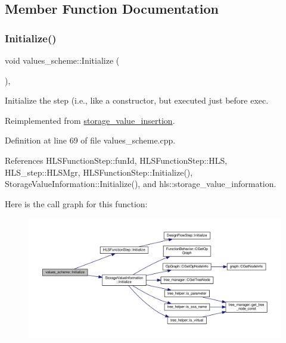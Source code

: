 \subsection{Member Function Documentation}
\mbox{\label{classvalues__scheme_aa31c876e845bc7ea78495e0b789cc51f}} 
\subsubsection{\texorpdfstring{Initialize()}{Initialize()}}
{\footnotesize\ttfamily void values\+\_\+scheme\+::\+Initialize (\begin{DoxyParamCaption}{ }\end{DoxyParamCaption})\hspace{0.3cm}{\ttfamily [override]}, {\ttfamily [virtual]}}



Initialize the step (i.\+e., like a constructor, but executed just before exec. 



Reimplemented from \hyperlink{classstorage__value__insertion_a43f36ebf82f907a629125b1f0cc1b096}{storage\+\_\+value\+\_\+insertion}.



Definition at line 69 of file values\+\_\+scheme.\+cpp.



References H\+L\+S\+Function\+Step\+::fun\+Id, H\+L\+S\+Function\+Step\+::\+H\+LS, H\+L\+S\+\_\+step\+::\+H\+L\+S\+Mgr, H\+L\+S\+Function\+Step\+::\+Initialize(), Storage\+Value\+Information\+::\+Initialize(), and hls\+::storage\+\_\+value\+\_\+information.

Here is the call graph for this function\+:
\nopagebreak
\begin{figure}[H]
\begin{center}
\leavevmode
\includegraphics[width=350pt]{dc/d08/classvalues__scheme_aa31c876e845bc7ea78495e0b789cc51f_cgraph}
\end{center}
\end{figure}
\mbox{\label{classvalues__scheme_a50f8ae25513ed41d826c56758af143c3}} 
